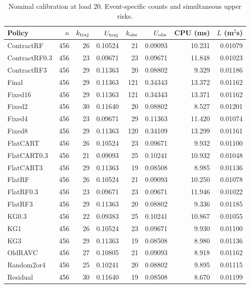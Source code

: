 \begin{table}[!htbp]\centering\footnotesize
\caption{Nominal calibration at load 20. Event-specific counts and simultaneous upper risks.}\label{supp:calnominal_calibration20}
\begin{tabular}{@{}lrrrrrrr@{}}\toprule
Policy & $n$ & $k_{\rm traj}$ & $U_{\rm traj}$ & $k_{\rm obs}$ & $U_{\rm obs}$ & CPU (ms) & $L$ (m$^2$s)\\\midrule
ContractRF & 456 & 26 & 0.10524 & 21 & 0.09093 & 10.231 & 0.01079\\
ContractRF0.3 & 456 & 23 & 0.09671 & 23 & 0.09671 & 11.848 & 0.01023\\
ContractRF3 & 456 & 29 & 0.11363 & 20 & 0.08802 & 9.329 & 0.01186\\
Final & 456 & 29 & 0.11363 & 121 & 0.34343 & 13.372 & 0.01162\\
Fixed16 & 456 & 29 & 0.11363 & 121 & 0.34343 & 13.371 & 0.01162\\
Fixed2 & 456 & 30 & 0.11640 & 20 & 0.08802 & 8.527 & 0.01201\\
Fixed4 & 456 & 23 & 0.09671 & 29 & 0.11363 & 11.420 & 0.01074\\
Fixed8 & 456 & 29 & 0.11363 & 120 & 0.34109 & 13.299 & 0.01161\\
FlatCART & 456 & 26 & 0.10524 & 23 & 0.09671 & 9.932 & 0.01100\\
FlatCART0.3 & 456 & 21 & 0.09093 & 25 & 0.10241 & 10.932 & 0.01048\\
FlatCART3 & 456 & 29 & 0.11363 & 19 & 0.08508 & 8.985 & 0.01136\\
FlatRF & 456 & 26 & 0.10524 & 21 & 0.09093 & 10.250 & 0.01078\\
FlatRF0.3 & 456 & 23 & 0.09671 & 23 & 0.09671 & 11.946 & 0.01022\\
FlatRF3 & 456 & 29 & 0.11363 & 20 & 0.08802 & 9.336 & 0.01185\\
KG0.3 & 456 & 22 & 0.09383 & 25 & 0.10241 & 10.867 & 0.01055\\
KG1 & 456 & 26 & 0.10524 & 23 & 0.09671 & 9.930 & 0.01100\\
KG3 & 456 & 29 & 0.11363 & 19 & 0.08508 & 8.980 & 0.01136\\
OldRAVC & 456 & 27 & 0.10805 & 21 & 0.09093 & 8.918 & 0.01162\\
Random2or4 & 456 & 25 & 0.10241 & 20 & 0.08802 & 9.895 & 0.01115\\
Residual & 456 & 30 & 0.11640 & 19 & 0.08508 & 8.670 & 0.01199\\
\bottomrule\end{tabular}\end{table}

